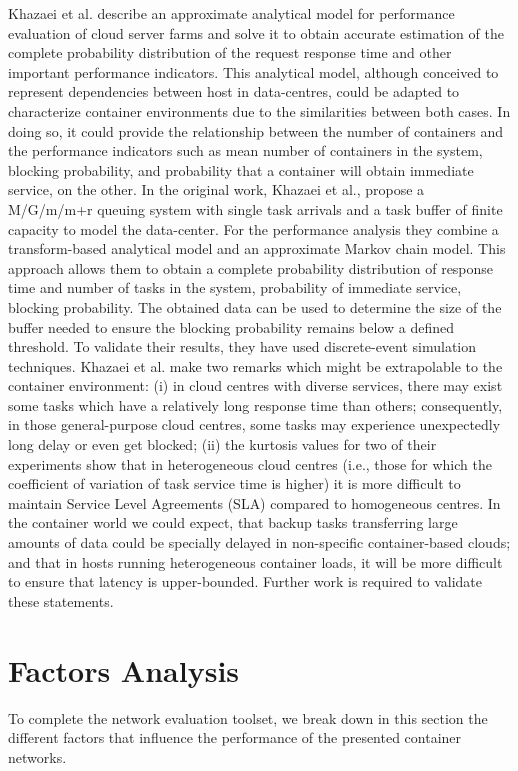 \documentclass[conference]{IEEEtran}
\begin{document}
Khazaei et al. \cite{IEEE_2012:Khazaei} describe an approximate analytical model for performance evaluation of cloud server farms and solve it to obtain accurate estimation of the complete probability distribution of the request response time and other important performance indicators. This analytical model, although conceived to represent dependencies between host in data-centres, could be adapted to characterize container environments due to the similarities between both cases. In doing so, it could provide the relationship between the number of containers and the performance indicators such as mean number of containers in the system, blocking probability, and probability that a container will obtain immediate service, on the other. In the original work, Khazaei et al., propose a M/G/m/m+r queuing system with single task arrivals and a task buffer of finite capacity to model the data-center. For the performance analysis they combine a transform-based analytical model and an approximate Markov chain model. This approach allows them to obtain a complete probability distribution of response time and number of tasks in the system, probability of immediate service, blocking probability. The obtained data can be used to determine the size of the buffer needed to ensure the blocking probability remains below a defined threshold. To validate their results, they have used discrete-event simulation techniques. Khazaei et al. make two remarks which might be extrapolable to the container environment: (i) in cloud centres with diverse services, there may exist some tasks which have a relatively long response time than others; consequently, in those general-purpose cloud centres, some tasks may experience unexpectedly long delay or even get blocked; (ii) the kurtosis values for two of their experiments show that in heterogeneous cloud centres (i.e., those for which the coefficient of variation of task service time is higher) it is more difficult to maintain Service Level Agreements (SLA) compared to homogeneous centres. In the container world we could expect, that backup tasks transferring large amounts of data could be specially delayed in non-specific container-based clouds; and that in hosts running heterogeneous container loads, it will be more difficult to ensure that latency is upper-bounded. Further work is required to validate these statements.


\section{Factors Analysis}
To complete the network evaluation toolset, we break down in this section the different factors that influence the performance of the presented container networks.
\end{document}
